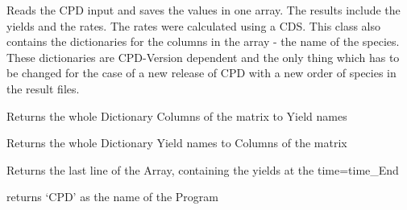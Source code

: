 \documentclass[letterpaper,10pt,english]{sphinxmanual}
\begin{document}
\begin{fulllineitems}
\label{CPDClasses:Fit_one_run.CPD_Result}
Reads the CPD input and saves the values in one array. The results include the yields and the rates. The rates were calculated using a CDS. This class also contains the dictionaries for the columns in the array - the name of the species. These dictionaries are CPD-Version dependent and the only thing which has to be changed for the case of a new release of CPD with a new order of species in the result files.

\begin{fulllineitems}
\label{CPDClasses:Fit_one_run.CPD_Result.DictCols2Yields}
Returns the whole Dictionary Columns of the matrix to Yield names

\end{fulllineitems}


\begin{fulllineitems}
\label{CPDClasses:Fit_one_run.CPD_Result.DictYields2Cols}
Returns the whole Dictionary Yield names to Columns of the matrix

\end{fulllineitems}


\begin{fulllineitems}
\label{CPDClasses:Fit_one_run.CPD_Result.FinalYields}
Returns the last line of the Array, containing the yields at the time=time\_End

\end{fulllineitems}


\begin{fulllineitems}
\label{CPDClasses:Fit_one_run.CPD_Result.Name}
returns `CPD' as the name of the Program

\end{fulllineitems}



\end{fulllineitems}
\end{document}
